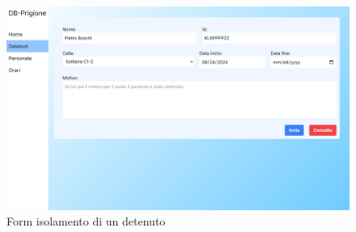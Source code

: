 \documentclass[a4paper,12pt]{report}
\begin{document}
\begin{figure}[H]
\caption{Form isolamento di un detenuto}
\includegraphics[width=\textheight, keepaspectratio, angle=90,origin=c]{pagina_isolamento.png}  
\end{figure}
\end{document}
